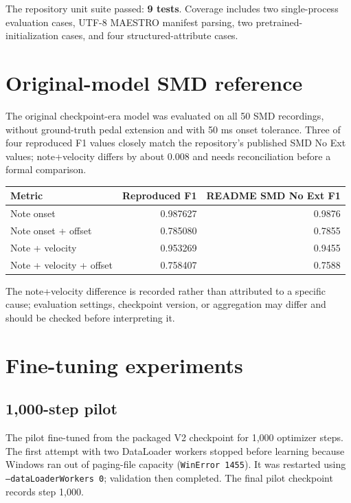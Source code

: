 \documentclass[11pt]{article}
\begin{document}
The repository unit suite passed: \textbf{9 tests}. Coverage includes two
single-process evaluation cases, UTF-8 MAESTRO manifest parsing, two
pretrained-initialization cases, and four structured-attribute cases.

\section{Original-model SMD reference}

The original checkpoint-era model was evaluated on all 50 SMD recordings,
without ground-truth pedal extension and with 50 ms onset tolerance. Three
of four reproduced F1 values closely match the repository's published SMD
No Ext values; note+velocity differs by about 0.008 and needs reconciliation
before a formal comparison.

\begin{center}
\begin{tabular}{lrr}
\toprule
\textbf{Metric} & \textbf{Reproduced F1} & \textbf{README SMD No Ext F1} \\
\midrule
Note onset & 0.987627 & 0.9876 \\
Note onset + offset & 0.785080 & 0.7855 \\
Note + velocity & 0.953269 & 0.9455 \\
Note + velocity + offset & 0.758407 & 0.7588 \\
\bottomrule
\end{tabular}
\end{center}

The note+velocity difference is recorded rather than attributed to a
specific cause; evaluation settings, checkpoint version, or aggregation may
differ and should be checked before interpreting it.

\section{Fine-tuning experiments}

\subsection{1,000-step pilot}

The pilot fine-tuned from the packaged V2 checkpoint for 1,000 optimizer
steps. The first attempt with two DataLoader workers stopped before learning
because Windows ran out of paging-file capacity (\texttt{WinError 1455}).
It was restarted using \texttt{--dataLoaderWorkers 0}; validation then
completed. The final pilot checkpoint records step 1,000.
\end{document}
